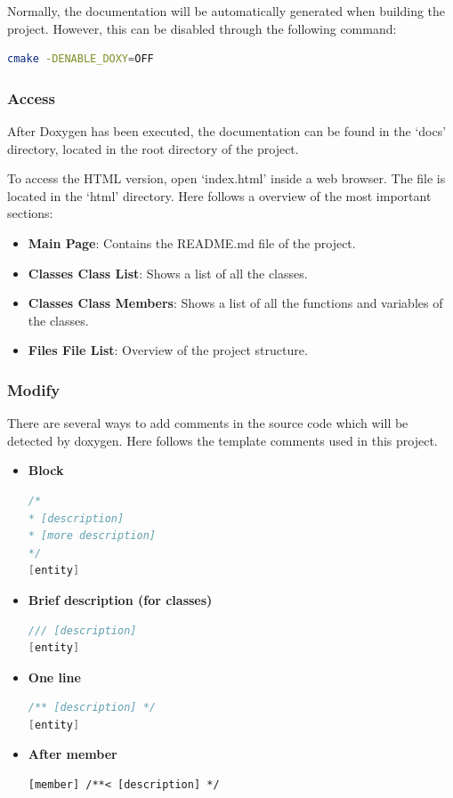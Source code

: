 \documentclass[]{article}
\begin{document}
Normally, the documentation will be automatically generated when building the project. However, this can be disabled through the following command:
\begin{lstlisting}[language=bash]
cmake -DENABLE_DOXY=OFF
\end{lstlisting}

\subsubsection{Access}
After Doxygen has been executed, the documentation can be found in the ‘docs’ directory, located in the root directory of the project.

To access the HTML version, open ‘index.html’ inside a web browser. The file is located in the ‘html’ directory. Here follows a overview of the most important sections:
\begin{itemize}
	\itemsep 0em
	\item \textbf{Main Page}: Contains the README.md file of the project.
	\item \textbf{Classes \textrangle{} Class List}: Shows a list of all the classes.
	\item \textbf{Classes \textrangle{} Class Members}: Shows a list of all the functions and variables of the classes.
	\item \textbf{Files \textrangle{} File List}: Overview of the project structure.
\end{itemize}

\subsubsection{Modify}
There are several ways to add comments in the source code which will be detected by doxygen. Here follows the template comments used in this project.
\begin{itemize}
\item \textbf{Block}
\begin{lstlisting}[language=C++]
/*
* [description]
* [more description]
*/
[entity]
\end{lstlisting}

\item \textbf{Brief description (for classes)}
\begin{lstlisting}[language=C++]
/// [description]
[entity]
\end{lstlisting}

\item \textbf{One line}
\begin{lstlisting}[language=C++]
/** [description] */
[entity]
\end{lstlisting}

\item \textbf{After member}
\begin{lstlisting}
[member] /**< [description] */
\end{lstlisting}

\end{itemize}
\end{document}

